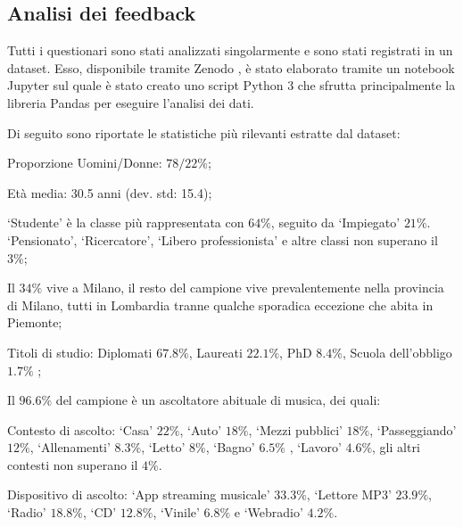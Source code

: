 \documentclass[12pt,a4paper]{report}
\begin{document}
 
\subsection{Analisi dei feedback}


Tutti i questionari sono stati analizzati singolarmente e sono stati registrati in un dataset. %
Esso, disponibile tramite Zenodo \cite{datiQuestionario}, è stato elaborato tramite un notebook Jupyter\cite{jupyter} sul quale è stato creato uno script Python 3 che sfrutta principalmente la libreria Pandas\cite{pandasLib} per eseguire l'analisi dei dati.

Di seguito sono riportate le statistiche più rilevanti estratte dal dataset:

\begin{compactitem}
	\item Proporzione Uomini/Donne: $78/22\%$;
	
	\item Età media: 30.5 anni (dev. std: 15.4);
	
	\item `Studente' è la classe più rappresentata con $64\%$, seguito da `Impiegato' $21\%$. `Pensionato', `Ricercatore', `Libero professionista' e altre classi non superano il $3\%$;
	
	\item Il $34\%$ vive a Milano, il resto del campione vive prevalentemente nella provincia di Milano, tutti in Lombardia tranne qualche sporadica eccezione che abita in Piemonte;
	
	\item Titoli di studio: Diplomati $67.8\%$, Laureati $22.1\%$, PhD $8.4\%$, Scuola dell'obbligo $1.7\%$ ;
	
	\item Il $96.6\%$ del campione è un ascoltatore abituale di musica, dei quali:
	\begin{compactitem}
		
		\item Contesto di ascolto: `Casa' $22\%$, `Auto' $18\%$, `Mezzi pubblici' $18\%$, `Passeggiando' $12\%$, `Allenamenti' $8.3\%$, `Letto' $8\%$, `Bagno' $6.5\%$ , `Lavoro' $4.6\%$, gli altri contesti non superano il $4\%$.
		
		\item Dispositivo di ascolto: `App streaming musicale' $33.3\%$, `Lettore MP3' $23.9\%$, `Radio' $18.8\%$, `CD' $12.8\%$, `Vinile' $6.8\%$ e `Webradio' $4.2\%$.\\
		
	\end{compactitem}
	
\end{compactitem}
\end{document}
